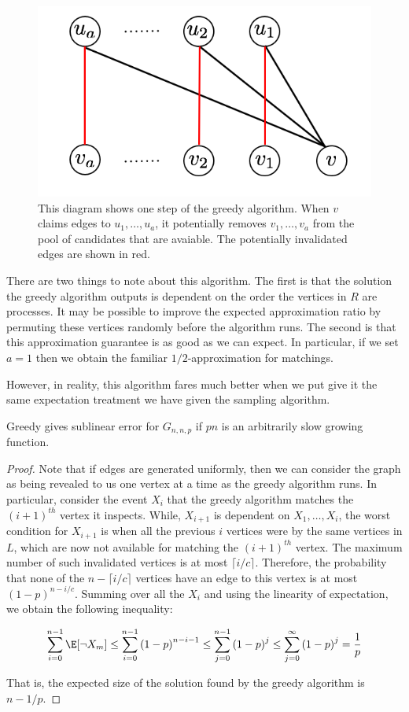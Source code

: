 \begin{figure}[h]
\centering
\includegraphics[width=.5\textwidth]{greedy.png}
\begin{minipage}[h]{.8\linewidth}
\caption{This diagram shows one step of the greedy algorithm. When $v$ claims edges to $u_1,\ldots, u_a$, it potentially removes $v_1,\ldots, v_a$ from the pool of candidates that are avaiable. The potentially invalidated edges are shown in red.}
\end{minipage}
\end{figure}

There are two things to note about this algorithm. The first is
that the solution the greedy algorithm outputs is dependent on the
order the vertices in $R$ are processes. It may be possible to improve
the expected approximation ratio by permuting these vertices randomly
before the algorithm runs. The second is that this approximation
guarantee is as good as we can expect. In particular, if we set $a=1$
then we obtain the familiar $1/2$-approximation for matchings.

However, in reality, this algorithm fares much better when we put give
it the same expectation treatment we have given the sampling algorithm.

\begin{thm}
Greedy gives sublinear error for $G_{n,n,p}$ if $pn$ is an arbitrarily slow growing function.
\end{thm}
\begin{proof}
Note that if edges are generated uniformly, then we can consider the
graph as being revealed to us one vertex at a time as the greedy
algorithm runs. In particular, consider the event $X_i$ that the 
greedy algorithm matches the $(i+1)^{th}$ vertex it inspects. While,
$X_{i+1}$ is dependent on $X_1,\ldots, X_i$, the worst condition for
$X_{i+1}$ is when all the previous $i$ vertices were by the same
vertices in $L$, which are now not available for matching the 
$(i+1)^{th}$ vertex. The maximum number of such invalidated vertices
is at most $\lceil i/c \rceil$. Therefore, the probability that none
of the $n-\lceil i/c \rceil $ vertices have an edge to this vertex is
at most $(1-p)^{n-i/c}$. Summing over all the $X_i$ and using the 
linearity of expectation, we obtain the following inequality:

\[
\sum_{i=0}^{n-1} \E[\lnot X_m] \leq \sum_{i=0}^{n-1} \left(1-p\right)^{n- i-1} \leq \sum_{j=0}^{n-1} \left(1-p\right)^j \leq\sum_{j=0}^{\infty} \left(1-p\right)^j = \frac{1}{p}
\]

That is, the expected size of the solution found by the greedy algorithm is $n-1/p$.
\end{proof}
